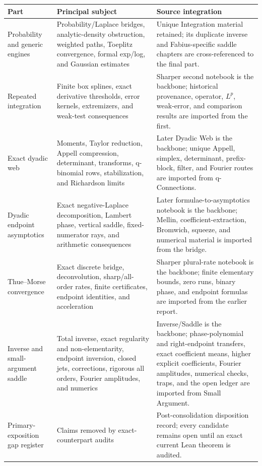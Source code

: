 \documentclass[11pt,oneside]{article}
\theoremstyle{definition}
\theoremstyle{remark}
\begin{document}
\begin{longtable}{@{}>{\raggedright\arraybackslash}p{}
                         >{\raggedright\arraybackslash}p{}
                         >{\raggedright\arraybackslash}p{}@{}}
\toprule
Part & Principal subject & Source integration \\
\midrule
\endhead
Probability and generic engines & Probability/Laplace bridges, analytic-density obstruction, weighted paths, Toeplitz convergence, formal exp/log, and Gaussian estimates & Unique Integration material retained; its duplicate inverse and Fabius-specific saddle chapters are cross-referenced to the final part. \\
Repeated integration & Finite box splines, exact derivative thresholds, error kernels, extremizers, and weak-test consequences & Sharper second notebook is the backbone; historical provenance, operator, \(L^p\), weak-error, and comparison results are imported from the first. \\
Exact dyadic web & Moments, Taylor reduction, Appell compression, determinant, transforms, q-binomial rows, stabilization, and Richardson limits & Later Dyadic Web is the backbone; unique Appell, simplex, determinant, prefix-block, filter, and Fourier routes are imported from q-Connections. \\
Dyadic endpoint asymptotics & Exact negative-Laplace decomposition, Lambert phase, vertical saddle, fixed-numerator rays, and arithmetic consequences & Later formulae-to-asymptotics notebook is the backbone; Mellin, coefficient-extraction, Bromwich, squeeze, and numerical material is imported from the bridge. \\
Thue--Morse convergence & Exact discrete bridge, deconvolution, sharp/all-order rates, finite certificates, endpoint identities, and acceleration & Sharper plural-rate notebook is the backbone; finite elementary bounds, zero runs, binary phase, and endpoint formulas are imported from the earlier report. \\
Inverse and small-argument saddle & Total inverse, exact regularity and non-elementarity, endpoint inversion, closed jets, corrections, rigorous all orders, Fourier amplitudes, and numerics & Inverse/Saddle is the backbone; phase-polynomial and right-endpoint transfers, exact coefficient means, higher explicit coefficients, Fourier amplitudes, numerical checks, traps, and the open ledger are imported from Small Argument. \\
Primary-exposition gap register & Claims removed by exact-counterpart audits & Post-consolidation disposition record; every candidate remains open until an exact current Lean theorem is audited. \\
\bottomrule
\end{longtable}
\end{document}
